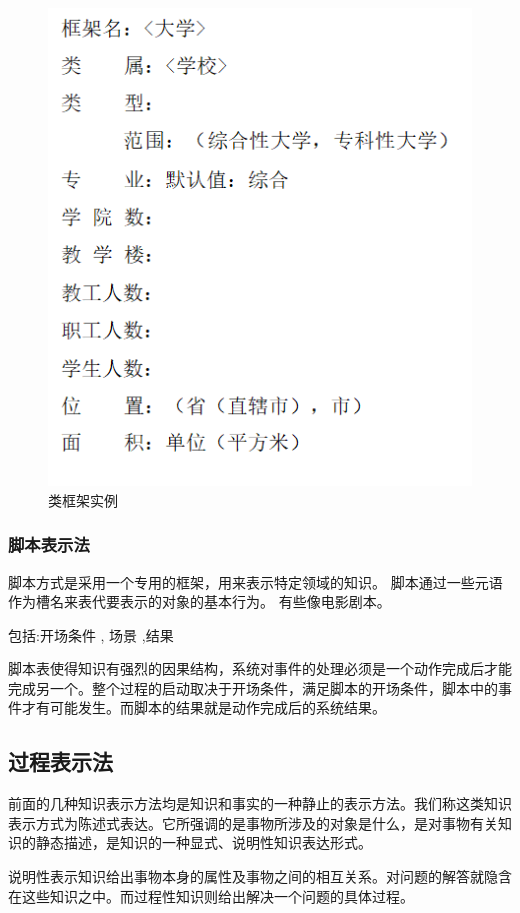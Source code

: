 \documentclass[UTF8,a4paper]{ctexart}
\begin{document}
\begin{figure}[H]
	\centering
	\includegraphics[scale = 0.5]{assets/ArtificialIntelligence_af860.png}
	\caption{类框架实例}
\end{figure}

\subsubsection{脚本表示法}
脚本方式是采用一个专用的框架，用来表示特定领域的知识。
脚本通过一些元语作为槽名来表代要表示的对象的基本行为。
有些像电影剧本。

包括:开场条件 , 场景 ,结果

脚本表使得知识有强烈的因果结构，系统对事件的处理必须是一个动作完成后才能完成另一个。整个过程的启动取决于开场条件，满足脚本的开场条件，脚本中的事件才有可能发生。而脚本的结果就是动作完成后的系统结果。

\subsection{过程表示法}
前面的几种知识表示方法均是知识和事实的一种静止的表示方法。我们称这类知识表示方式为陈述式表达。它所强调的是事物所涉及的对象是什么，是对事物有关知识的静态描述，是知识的一种显式、说明性知识表达形式。

说明性表示知识给出事物本身的属性及事物之间的相互关系。对问题的解答就隐含在这些知识之中。而过程性知识则给出解决一个问题的具体过程。
\end{document}
